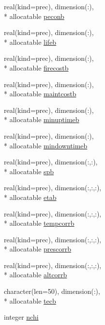 \begin{DoxyCompactItemize}
\item 
real(kind=prec), dimension(\-:), \\*
allocatable \hyperlink{classinputvar_adfc7efd23b85b75ea9411b9da5e8ccbd}{peconb}
\item 
real(kind=prec), dimension(\-:), \\*
allocatable \hyperlink{classinputvar_a74dcd10e62524e2f5145df13548eae82}{lifeb}
\item 
real(kind=prec), dimension(\-:), \\*
allocatable \hyperlink{classinputvar_a1560f8312d0c0606566ee8f7e21c1e49}{firecostb}
\item 
real(kind=prec), dimension(\-:), \\*
allocatable \hyperlink{classinputvar_ac52f743f02f10e96c455d94c3cdc0fe8}{maintcostb}
\item 
real(kind=prec), dimension(\-:), \\*
allocatable \hyperlink{classinputvar_a699644b9b98282661cd55dc10d96dbcb}{minuptimeb}
\item 
real(kind=prec), dimension(\-:), \\*
allocatable \hyperlink{classinputvar_ae93da8603e9899963da53596705b1d98}{mindowntimeb}
\item 
real(kind=prec), dimension(\-:,\-:), \\*
allocatable \hyperlink{classinputvar_acd5ae0efcfc5e54e9c73d085132bcf5a}{spb}
\item 
real(kind=prec), dimension(\-:,\-:,\-:), \\*
allocatable \hyperlink{classinputvar_adba062c6d3ce600124e2cd8943f7c6e6}{etab}
\item 
real(kind=prec), dimension(\-:,\-:,\-:), \\*
allocatable \hyperlink{classinputvar_a4270f23d875d4a85d7bd5d6699205d03}{tempcorrb}
\item 
real(kind=prec), dimension(\-:,\-:,\-:), \\*
allocatable \hyperlink{classinputvar_a4de979203fa5e65fe0cbfd77c60654ae}{prescorrb}
\item 
real(kind=prec), dimension(\-:,\-:,\-:), \\*
allocatable \hyperlink{classinputvar_a3fb49f59a3c5a2a19350be6bea0d69c2}{altcorrb}
\item 
character(len=50), dimension(\-:), \\*
allocatable \hyperlink{classinputvar_ab2486a625a1ff1aaf70cb9e38d8c07db}{tecb}
\item 
integer \hyperlink{classinputvar_ac34eff504af528e971c7174dfcb39028}{nchi}

\end{DoxyCompactItemize}
